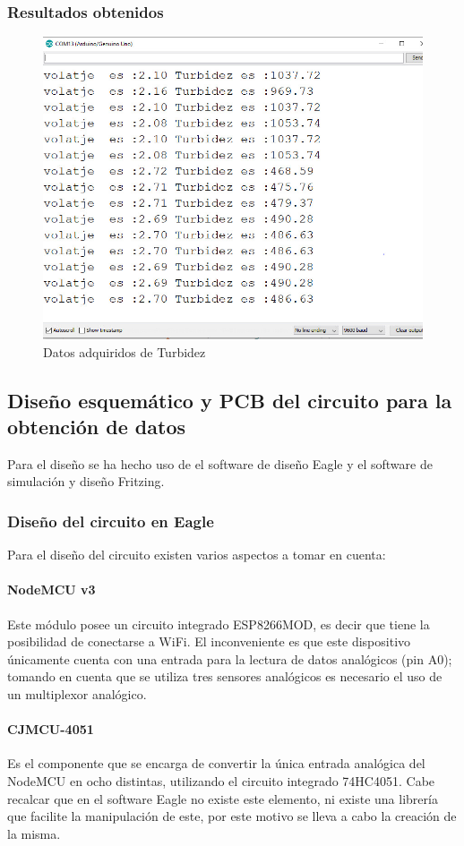 \documentclass[10pt,a4paper]{article}
\begin{document}
\subsubsection*{Resultados obtenidos}
\begin{figure}[H]
\centering
\includegraphics[scale=0.4]{Resultados/resTurbidez}
\caption{Datos adquiridos de Turbidez}
\end{figure}
\subsection{Diseño esquemático y PCB del circuito para la obtención de datos}\label{pcb}
Para el diseño se ha hecho uso de el software de diseño Eagle y el software de simulación y diseño Fritzing.
\subsubsection{Diseño del circuito en Eagle}
Para el diseño del circuito existen varios aspectos a tomar en cuenta:
\paragraph{NodeMCU v3} Este módulo posee un circuito integrado ESP8266MOD, es decir que tiene la posibilidad de conectarse a WiFi. El inconveniente es que este dispositivo únicamente cuenta con una entrada para la lectura de datos analógicos (pin A0); tomando en cuenta que se utiliza tres sensores analógicos es necesario el uso de un multiplexor analógico.
\paragraph{CJMCU-4051} Es el componente que se encarga de convertir la única entrada analógica del NodeMCU en ocho distintas, utilizando el circuito integrado 74HC4051. Cabe recalcar que en el software Eagle no existe este elemento, ni existe una librería que facilite la manipulación de este, por este motivo se lleva a cabo la creación de la misma.
\end{document}
